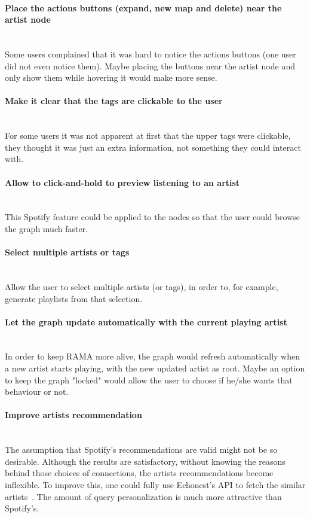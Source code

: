   \paragraph*{Place the actions buttons (expand, new map and delete) near the artist node} \hfill \\
  \indent Some users complained that it was hard to notice the actions buttons (one user did not even notice them).
  Maybe placing the buttons near the artist node and only show them while hovering it would make more sense.

  \paragraph*{Make it clear that the tags are clickable to the user} \hfill \\
  \indent For some users it was not apparent at first that the upper tags were clickable, they thought it was just an extra information, not something they could interact with.

  \paragraph*{Allow to click-and-hold to preview listening to an artist} \hfill \\
  \indent This Spotify feature could be applied to the nodes so that the user could browse the graph much faster.

  \paragraph*{Select multiple artists or tags} \hfill \\
  \indent Allow the user to select multiple artists (or tags), in order to, for example, generate playlists from that selection.

  \paragraph*{Let the graph update automatically with the current playing artist} \hfill \\
  \indent In order to keep RAMA more alive, the graph would refresh automatically when a new artist starts playing, with the new updated artist as root.
  Maybe an option to keep the graph "locked" would allow the user to choose if he/she wants that behaviour or not.

  \paragraph*{Improve artists recommendation} \hfill \\
  \indent The assumption that Spotify's recommendations are valid might not be so desirable.
  Although the results are satisfactory, without knowing the reasons behind those choices of connections, the artists recommendations become inflexible.
  To improve this, one could fully use Echonest's API to fetch the similar artists~\cite{echonestsimilar}.
  The amount of query personalization is much more attractive than Spotify's.

